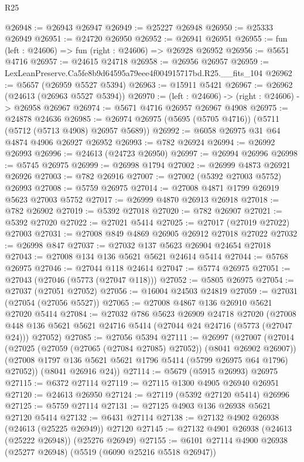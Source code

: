 \begin{lexlean}{R25}
\begin{coremodule}
@26948 := @26943 @26947
@26949 := @25227 @26948
@26950 := @25333 @26949
@26951 := @24720 @26950
@26952 := @26941 @26951
@26955 := fun (left : @24606) => fun (right : @24606) => @26928 @26952
@26956 := @5651 @4716
@26957 := @24615 @24718
@26958 := @26956 @26957
@26959 := LexLeanPreserve.Ca5fe8b9d64595a79eee4f004915717bd.R25.__fits_104
@26962 := @5657 (@26959 @5527 @5394)
@26963 := @15911 @5421
@26967 := @26962 (@24613 (@26963 @5527 @5394))
@26970 := (left : @24606) -> (right : @24606) -> @26958 @26967
@26974 := @5671 @4716 @26957 @26967 @4908
@26975 := @24878 @24636
@26985 := @26974 @26975 (@5695 (@5705 @4716)) (@5711 (@5712 (@5713 @4908) @26957 @5689))
@26992 := @6058 @26975 @31 @64 @4874 @4906 @26927 @26952
@26993 := @782 @26924
@26994 := @26992 @26993
@26996 := @24613 (@24723 @26950)
@26997 := @26994 @26996
@26998 := @5745 @26975
@26999 := @26998 @1794
@27002 := @26999 @4873 @26921 @26926
@27003 := @782 @26916
@27007 := @27002 (@5392 @27003 @5752) @26993
@27008 := @5759 @26975
@27014 := @27008 @4871 @1799 @26919 @5623 @27003 @5752
@27017 := @26999 @4870 @26913 @26918
@27018 := @782 @26902
@27019 := @5392 @27018
@27020 := @782 @26907
@27021 := @5392 @27020
@27022 := @27021 @5414
@27025 := @27017 (@27019 @27022) @27003
@27031 := @27008 @849 @4869 @26905 @26912 @27018 @27022
@27032 := @26998 @847
@27037 := @27032 @137 @5623 @26904 @24654 @27018
@27043 := @27008 @134 @136 @5621 @5621 @24614 @5414
@27044 := @5768 @26975
@27046 := @27044 @118 @24614
@27047 := @5774 @26975
@27051 := @27043 (@27046 (@5773 (@27047 @118)))
@27052 := @5805 @26975
@27054 := @27037 (@27051 @27052)
@27056 := @16004 @24503 @24819
@27059 := @27031 (@27054 (@27056 @5527))
@27065 := @27008 @4867 @136 @26910 @5621 @27020 @5414
@27084 := @27032
    @786
    @5623
    @26909
    @24718
    @27020
    (@27008 @448 @136 @5621 @5621 @24716 @5414 (@27044 @24 @24716 (@5773 (@27047 @24))) @27052)
@27085 := @27056 @5394
@27111 := @26997
    (@27007
      (@27014
        (@27025 (@27059 (@27065 (@27084 @27085) @27052)) (@8041 @26902 @26907))
        (@27008 @1797 @136 @5621 @5621 @1796 @5414 (@5799 @26975 @64 @1796) @27052))
      (@8041 @26916 @24))
@27114 := @5679 (@5915 @26993) @26975
@27115 := @6372 @27114
@27119 := @27115 @1300 @4905 @26940 @26951
@27120 := @24613 @26950
@27124 := @27119 (@5392 @27120 @5414) @26996
@27125 := @5759 @27114
@27131 := @27125 @4903 @136 @26938 @5621 @27120 @5414
@27132 := @6431 @27114
@27138 := @27132 @4902 @26938 (@24613 (@25225 @26949)) @27120
@27145 := @27132 @4901 @26938 (@24613 (@25222 @26948)) (@25276 @26949)
@27155 := @6101 @27114 @4900 @26938 (@25277 @26948) (@5519 (@6090 @25216 @5518 @26947))

\end{coremodule}
\end{lexlean}
